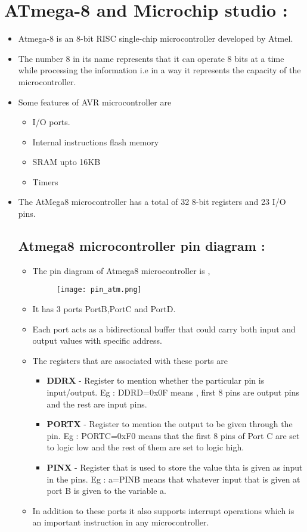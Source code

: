 \documentclass{article}
\begin{document}
\section*{ATmega-8 and Microchip studio :}
\begin{itemize}
    \item Atmega-8 is an 8-bit RISC single-chip microcontroller developed by Atmel.
    \item The number 8 in its name represents that it can operate 8 bits at a time while processing the information i.e in a way it represents the capacity of the microcontroller.
    \item Some features of AVR microcontroller are
    \begin{itemize}
        \item I/O ports.
        \item Internal instructions flash memory
        \item SRAM upto 16KB
        \item Timers
    \end{itemize}
    \item The AtMega8 microcontroller has a total of 32 8-bit registers and 23 I/O pins.
    \subsection*{Atmega8 microcontroller pin diagram :}
    \begin{itemize}
        \item The pin diagram of Atmega8 microcontroller is ,
        \begin{figure}[H]
            \centering
            \texttt{[image: pin\_atm.png]}
        \end{figure}
        \item It has 3 ports PortB,PortC and PortD.
        \item Each port acts as a bidirectional buffer that could carry both input and output values with specific address.
        \item The registers that are associated with these ports are 
        \begin{itemize}
            \item \textbf{DDRX} - Register to mention whether the particular pin is input/output.
            Eg : DDRD=0x0F means , first 8 pins are output pins and the rest are input pins.
            \item \textbf{PORTX} - Register to mention the output to be given through the pin.
            Eg : PORTC=0xF0 means that the first 8 pins of Port C are set to logic low and the rest of them are set to logic high.
            \item \textbf{PINX} - Register that is used to store the value thta is given as input in the pins.
            Eg : a=PINB means that whatever input that is given at port B is given to the variable a.
        \end{itemize}
        \item In addition to these ports it also supports interrupt operations which is an important instruction in any microcontroller.
    \end{itemize}

\end{itemize}
\end{document}
